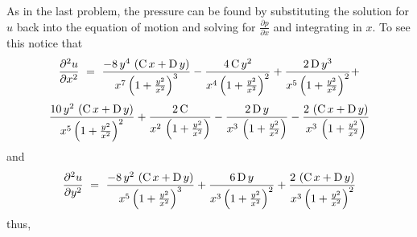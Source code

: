 \documentclass[12pt,twoside]{article}
\begin{document}
As in the last problem, the pressure can be found by substituting the solution
for $u$ back into the equation of motion and solving for $\frac{\partial
p}{\partial x}$ and integrating in $x$.   To see this notice that
\begin{displaymath}
\frac{\partial^2 u}{\partial x^2} ~=~ {{-8\,{y^4}\,\left( {\rm C}\,x + {\rm
D}\,y \right) }\over 
    {{x^7}\,{{\left( 1 + {{{y^2}}\over {{x^2}}} \right) }^
        3}}} - {{4\,{\rm C}\,{y^2}}\over 
    {{x^4}\,{{\left( 1 + {{{y^2}}\over {{x^2}}} \right) }^
        2}}} + {{2\,{\rm D}\,{y^3}}\over 
    {{x^5}\,{{\left( 1 + {{{y^2}}\over {{x^2}}} \right) }^
        2}}} + 
\end{displaymath}
\begin{equation}
{{10\,{y^2}\,
      \left( {\rm C}\,x + {\rm D}\,y \right) }\over 
    {{x^5}\,{{\left( 1 + {{{y^2}}\over {{x^2}}} \right) }^
        2}}} + {{2\,{\rm C}}\over 
    {{x^2}\,\left( 1 + {{{y^2}}\over {{x^2}}} \right) }} - 
  {{2\,{\rm D}\,y}\over 
    {{x^3}\,\left( 1 + {{{y^2}}\over {{x^2}}} \right) }} - 
  {{2\,\left( {\rm C}\,x + {\rm D}\,y \right) }\over 
    {{x^3}\,\left( 1 + {{{y^2}}\over {{x^2}}} \right) }}
\end{equation}
and
\begin{equation}
\frac{\partial^2 u}{\partial y^2} ~=~{{-8\,{y^2}\,\left( {\rm C}\,x + {\rm D}\,y
\right) }\over 
    {{x^5}\,{{\left( 1 + {{{y^2}}\over {{x^2}}} \right) }^
        3}}} + {{6\,{\rm D}\,y}\over 
    {{x^3}\,{{\left( 1 + {{{y^2}}\over {{x^2}}} \right) }^
        2}}} + {{2\,\left( {\rm C}\,x + {\rm D}\,y \right)}
     \over {{x^3}\,{{\left( 1 + {{{y^2}} \over {{x^2}}} \right
           ) }^2}}}
\end{equation}
thus,
\end{document}
